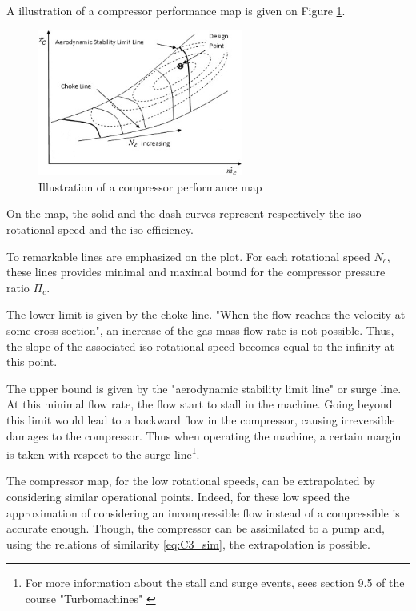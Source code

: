 A illustration of a compressor performance map is given on Figure \ref{fig:C3_compmap}.
\begin{figure}[h]
\centering
\includegraphics[width=0.6\textwidth]{Comp_Map.png}
\caption{Illustration of a compressor performance map \citep{Ghorbanian2009}}
\label{fig:C3_compmap}
\end{figure}  

On the map, the solid and the dash curves represent respectively the iso-rotational speed and the iso-efficiency.

To remarkable lines are emphasized on the plot. For each rotational speed $N_c$, these lines provides minimal and maximal bound for the compressor pressure ratio $\Pi_c$. 

The lower limit is given by the choke line. "When the flow reaches the velocity at some cross-section"\citep{Ghorbanian2009}, an increase of the gas mass flow rate is not possible. Thus, the slope of the associated iso-rotational speed becomes equal to the infinity at this point. 

The upper bound is given by the "aerodynamic stability limit line" or surge line. At this minimal flow rate, the flow start to stall in the machine. Going beyond this limit would lead to a backward flow in the compressor, causing irreversible damages to the compressor. Thus when operating the machine, a certain margin is taken with respect to the surge line\footnote{For more information about the stall and surge events, sees section 9.5 of the course "Turbomachines" \citep{Hillewaert2019}}.

The compressor map, for the low rotational speeds, can be extrapolated by considering similar operational points. Indeed, for these low speed the approximation of considering an incompressible flow instead of a compressible is accurate enough. Though, the compressor can be assimilated to a pump and, using the relations of similarity \ref{eq:C3_sim}, the extrapolation is possible. 

